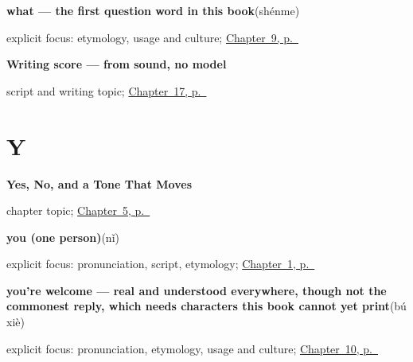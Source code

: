 \noindent\begin{minipage}[t]{\linewidth}
\raggedright
\textbf{what — the first question word in this book}\enspace\emph{}\enspace(shénme)\par
\footnotesize explicit focus: etymology, usage and culture; \hyperref[ch:zh-shenme]{Chapter~9, p.~\pageref*{ch:zh-shenme}}
\end{minipage}\par\smallskip

\noindent\begin{minipage}[t]{\linewidth}
\raggedright
\textbf{Writing score — from sound, no model}\par
\footnotesize script and writing topic; \hyperref[ch:zh-language-country]{Chapter~17, p.~\pageref*{ch:zh-language-country}}
\end{minipage}\par\smallskip

\section*{Y}

\noindent\begin{minipage}[t]{\linewidth}
\raggedright
\textbf{Yes, No, and a Tone That Moves}\par
\footnotesize chapter topic; \hyperref[ch:zh-shi]{Chapter~5, p.~\pageref*{ch:zh-shi}}
\end{minipage}\par\smallskip

\noindent\begin{minipage}[t]{\linewidth}
\raggedright
\textbf{you (one person)}\enspace\emph{}\enspace(nǐ)\par
\footnotesize explicit focus: pronunciation, script, etymology; \hyperref[ch:zh-nihao]{Chapter~1, p.~\pageref*{ch:zh-nihao}}
\end{minipage}\par\smallskip

\noindent\begin{minipage}[t]{\linewidth}
\raggedright
\textbf{you're welcome — real and understood everywhere, though not the commonest reply, which needs characters this book cannot yet print}\enspace\emph{}\enspace(bú xiè)\par
\footnotesize explicit focus: pronunciation, etymology, usage and culture; \hyperref[ch:zh-xiexie]{Chapter~10, p.~\pageref*{ch:zh-xiexie}}
\end{minipage}\par\smallskip

